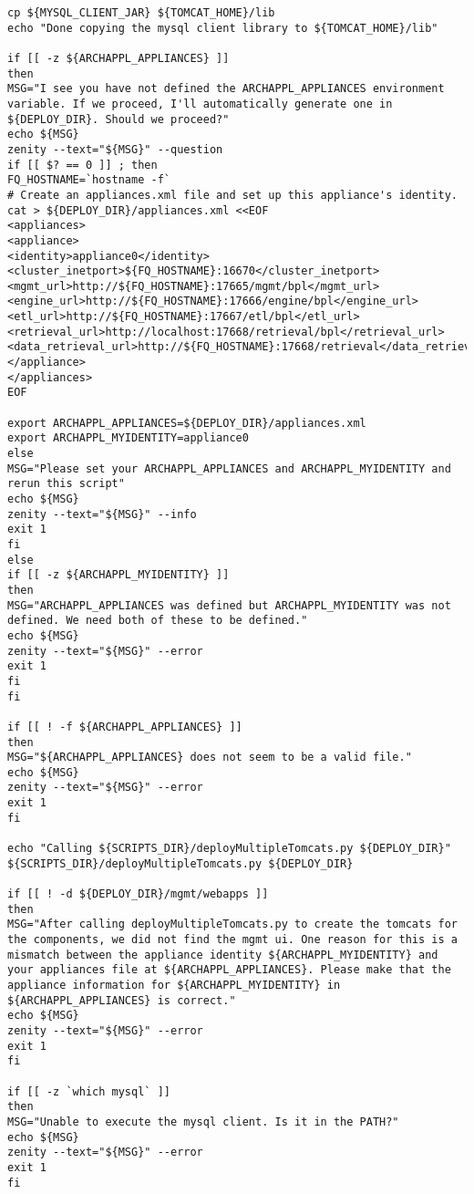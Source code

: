 \documentclass[11pt
  , a4paper
  , article
  , oneside
]{memoir}
\begin{document}
\begin{lstlisting}[style=termstyle]
cp ${MYSQL_CLIENT_JAR} ${TOMCAT_HOME}/lib
echo "Done copying the mysql client library to ${TOMCAT_HOME}/lib"

if [[ -z ${ARCHAPPL_APPLIANCES} ]]
then
MSG="I see you have not defined the ARCHAPPL_APPLIANCES environment variable. If we proceed, I'll automatically generate one in ${DEPLOY_DIR}. Should we proceed?"
echo ${MSG}
zenity --text="${MSG}" --question
if [[ $? == 0 ]] ; then
FQ_HOSTNAME=`hostname -f`
# Create an appliances.xml file and set up this appliance's identity.
cat > ${DEPLOY_DIR}/appliances.xml <<EOF
<appliances>
<appliance>
<identity>appliance0</identity>
<cluster_inetport>${FQ_HOSTNAME}:16670</cluster_inetport>
<mgmt_url>http://${FQ_HOSTNAME}:17665/mgmt/bpl</mgmt_url>
<engine_url>http://${FQ_HOSTNAME}:17666/engine/bpl</engine_url>
<etl_url>http://${FQ_HOSTNAME}:17667/etl/bpl</etl_url>
<retrieval_url>http://localhost:17668/retrieval/bpl</retrieval_url>
<data_retrieval_url>http://${FQ_HOSTNAME}:17668/retrieval</data_retrieval_url>
</appliance>
</appliances>
EOF

export ARCHAPPL_APPLIANCES=${DEPLOY_DIR}/appliances.xml
export ARCHAPPL_MYIDENTITY=appliance0
else
MSG="Please set your ARCHAPPL_APPLIANCES and ARCHAPPL_MYIDENTITY and rerun this script"
echo ${MSG}
zenity --text="${MSG}" --info
exit 1
fi
else
if [[ -z ${ARCHAPPL_MYIDENTITY} ]]
then
MSG="ARCHAPPL_APPLIANCES was defined but ARCHAPPL_MYIDENTITY was not defined. We need both of these to be defined."
echo ${MSG}
zenity --text="${MSG}" --error
exit 1
fi
fi

if [[ ! -f ${ARCHAPPL_APPLIANCES} ]]
then
MSG="${ARCHAPPL_APPLIANCES} does not seem to be a valid file."
echo ${MSG}
zenity --text="${MSG}" --error
exit 1
fi

echo "Calling ${SCRIPTS_DIR}/deployMultipleTomcats.py ${DEPLOY_DIR}"
${SCRIPTS_DIR}/deployMultipleTomcats.py ${DEPLOY_DIR}

if [[ ! -d ${DEPLOY_DIR}/mgmt/webapps ]]
then
MSG="After calling deployMultipleTomcats.py to create the tomcats for the components, we did not find the mgmt ui. One reason for this is a mismatch between the appliance identity ${ARCHAPPL_MYIDENTITY} and your appliances file at ${ARCHAPPL_APPLIANCES}. Please make that the appliance information for ${ARCHAPPL_MYIDENTITY} in ${ARCHAPPL_APPLIANCES} is correct."
echo ${MSG}
zenity --text="${MSG}" --error
exit 1	
fi

if [[ -z `which mysql` ]]
then
MSG="Unable to execute the mysql client. Is it in the PATH?"
echo ${MSG}
zenity --text="${MSG}" --error
exit 1
fi


\end{lstlisting}
\end{document}
